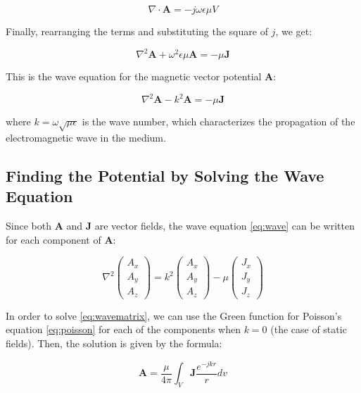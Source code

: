 \[
    \nabla \cdot \mathbf{A} = - j \omega \epsilon 
    \mu V
\]

Finally, rearranging the terms and substituting 
the square of $j$, we get:

\[
    \nabla^2 \mathbf{A} + \omega^2 \epsilon \mu 
    \mathbf{A} = -\mu \mathbf{J}
\]

This is the wave equation for the magnetic vector 
potential \(\mathbf{A}\):

\begin{equation}
    \nabla^2 \mathbf{A} - k^2 \mathbf{A} = 
    -\mu \mathbf{J}
    \label{eq:wave}
\end{equation}

where \(k = \omega \sqrt{\mu \epsilon}\) is the wave 
number, which characterizes the propagation of the 
electromagnetic wave in the medium.
\subsection{Finding the Potential by Solving the Wave Equation}

Since both \(\mathbf{A}\) and \(\mathbf{J}\) are vector 
fields, the wave equation \ref{eq:wave} can be written 
for each component of \(\mathbf{A}\):

\begin{equation}
    \nabla^2 
    \begin{pmatrix} 
        A_x \\ A_y \\ A_z 
    \end{pmatrix} = 
    k^2 
    \begin{pmatrix} 
        A_x \\ A_y \\ A_z 
    \end{pmatrix} - 
    \mu 
    \begin{pmatrix} 
        J_x \\ J_y \\ J_z 
    \end{pmatrix}
    \label{eq:wavematrix}
\end{equation}

In order to solve \ref{eq:wavematrix}, we can use the 
Green function for Poisson's equation \ref{eq:poisson} 
for each of the components when $k = 0$ (the case of 
static fields). Then, the solution is given by the 
formula:

\begin{equation}
    \mathbf{A} = \frac{\mu}{4 \pi} \int_V 
    \mathbf{J} \frac{e^{-jkr}}{r} dv
    \label{eq:solA}
\end{equation}

